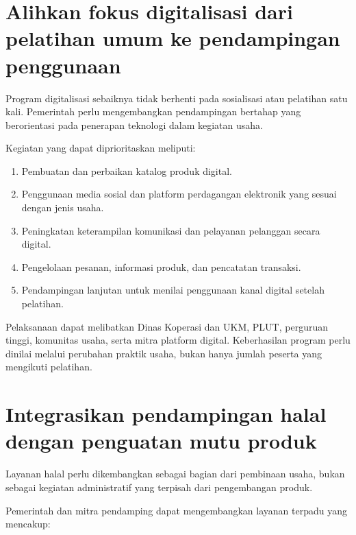 \documentclass[
  indonesian,
  11pt,
  a4paper,
]{report}
\providecommand{\tightlist}{%
  \setlength{\itemsep}{0pt}\setlength{\parskip}{0pt}}
\begin{document}
\section*{Alihkan fokus digitalisasi dari pelatihan umum ke pendampingan
penggunaan}\label{alihkan-fokus-digitalisasi-dari-pelatihan-umum-ke-pendampingan-penggunaan}

Program digitalisasi sebaiknya tidak berhenti pada sosialisasi atau
pelatihan satu kali. Pemerintah perlu mengembangkan pendampingan
bertahap yang berorientasi pada penerapan teknologi dalam kegiatan
usaha.

Kegiatan yang dapat diprioritaskan meliputi:

\begin{enumerate}
\def\labelenumi{\arabic{enumi}.}
\tightlist
\item
  Pembuatan dan perbaikan katalog produk digital.
\item
  Penggunaan media sosial dan platform perdagangan elektronik yang
  sesuai dengan jenis usaha.
\item
  Peningkatan keterampilan komunikasi dan pelayanan pelanggan secara
  digital.
\item
  Pengelolaan pesanan, informasi produk, dan pencatatan transaksi.
\item
  Pendampingan lanjutan untuk menilai penggunaan kanal digital setelah
  pelatihan.
\end{enumerate}

Pelaksanaan dapat melibatkan Dinas Koperasi dan UKM, PLUT, perguruan
tinggi, komunitas usaha, serta mitra platform digital. Keberhasilan
program perlu dinilai melalui perubahan praktik usaha, bukan hanya
jumlah peserta yang mengikuti pelatihan.

\section*{Integrasikan pendampingan halal dengan penguatan mutu
produk}\label{integrasikan-pendampingan-halal-dengan-penguatan-mutu-produk}

Layanan halal perlu dikembangkan sebagai bagian dari pembinaan usaha,
bukan sebagai kegiatan administratif yang terpisah dari pengembangan
produk.

Pemerintah dan mitra pendamping dapat mengembangkan layanan terpadu yang
mencakup:
\end{document}

